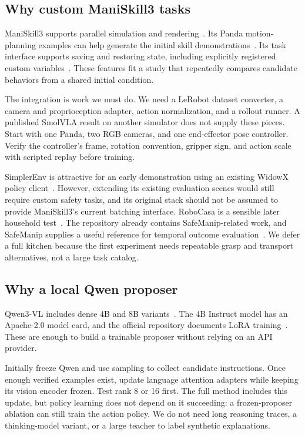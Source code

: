 \documentclass[11pt]{article}
\begin{document}
\subsection{Why custom ManiSkill3 tasks}

ManiSkill3 supports parallel simulation and rendering~\cite{maniskill}. Its Panda motion-planning examples can help generate the initial skill demonstrations~\cite{planning}. Its task interface supports saving and restoring state, including explicitly registered custom variables~\cite{state}. These features fit a study that repeatedly compares candidate behaviors from a shared initial condition.

The integration is work we must do. We need a LeRobot dataset converter, a camera and proprioception adapter, action normalization, and a rollout runner. A published SmolVLA result on another simulator does not supply these pieces. Start with one Panda, two RGB cameras, and one end-effector pose controller. Verify the controller's frame, rotation convention, gripper sign, and action scale with scripted replay before training.

SimplerEnv is attractive for an early demonstration using an existing WidowX policy client~\cite{simpler}. However, extending its existing evaluation scenes would still require custom safety tasks, and its original stack should not be assumed to provide ManiSkill3's current batching interface. RoboCasa is a sensible later household test~\cite{robocasa}. The repository already contains SafeManip-related work, and SafeManip supplies a useful reference for temporal outcome evaluation~\cite{safemanip}. We defer a full kitchen because the first experiment needs repeatable grasp and transport alternatives, not a large task catalog.

\subsection{Why a local Qwen proposer}

Qwen3-VL includes dense 4B and 8B variants~\cite{qwenreport}. The 4B Instruct model has an Apache-2.0 model card, and the official repository documents LoRA training~\cite{qwencard,qwenft}. These are enough to build a trainable proposer without relying on an API provider.

Initially freeze Qwen and use sampling to collect candidate instructions. Once enough verified examples exist, update language attention adapters while keeping its vision encoder frozen. Test rank 8 or 16 first. The full method includes this update, but policy learning does not depend on it succeeding: a frozen-proposer ablation can still train the action policy. We do not need long reasoning traces, a thinking-model variant, or a large teacher to label synthetic explanations.
\end{document}
